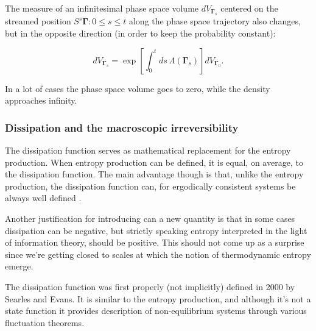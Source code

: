 \documentclass[a4paper,12pt]{article}
\begin{document}
The measure of an infinitesimal phase space volume $dV_{\bm{\Gamma}_s}$ centered on the streamed position $S^s\bm{\Gamma} : 0 \leq s \leq t $ along the phase space trajectory also changes, but in the opposite direction (in order to keep the probability constant):

\begin{equation}
\label{PhaseVolumeExpansion}
  dV_{\bm{\Gamma}_s} =\exp[\int_0^t ds\ \Lambda(\bm{\Gamma}_s)]dV_{\bm{\Gamma}_0}.
\end{equation}
 
In a lot of cases the phase space volume goes to zero, while the density approaches infinity\cite{Evans:2241458}.


\subsubsection{Dissipation and the macroscopic irreversibility}

The dissipation function serves as mathematical replacement for the entropy production. When entropy production can be defined, it is equal, on average, to the dissipation function. The main advantage though is that, unlike the entropy production, the dissipation function can, for ergodically consistent systems be always well defined \cite{Evans:2241458}.

Another justification for introducing can a new quantity is that in some cases dissipation can be negative, but strictly speaking entropy interpreted in the light of information theory, should be positive. This should not come up as a surprise since we're getting closed to scales at which the notion of thermodynamic entropy emerge. 

%

The dissipation function was first properly (not implicitly) defined in 2000 by Searles and Evans\cite{Searles:2000ig}. It is similar to the entropy production, and although it's not a state function it provides description of non-equilibrium systems through various fluctuation theorems.
\end{document}
